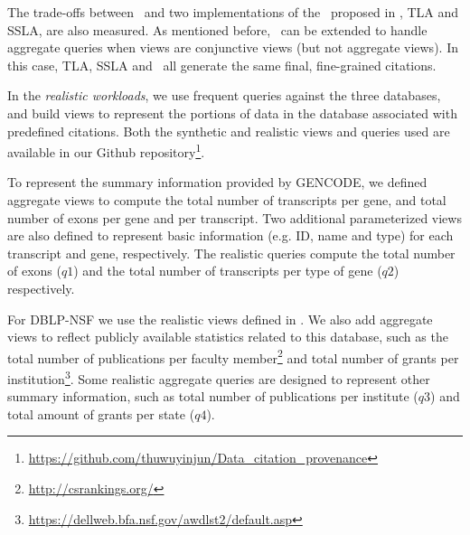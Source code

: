 The trade-offs between \provalg\ and two implementations of the \rba\ proposed in \cite{wu2018data}, TLA and SSLA, are also  measured. 
As mentioned before, \rba\ can be extended to handle aggregate queries when views are conjunctive views (but not aggregate views). In this case, TLA, SSLA and \provalg\ all generate the same final, fine-grained citations.


In the {\em realistic workloads}, we use frequent queries against the three databases, and build views to represent the portions of data in the database associated with predefined citations. Both the synthetic and realistic views and queries used are available in our Github repository\footnote{\url{https://github.com/thuwuyinjun/Data_citation_provenance}}. 

To represent the summary information provided by GENCODE, we defined aggregate views to compute the total number of transcripts per gene, and total number of exons per gene and per transcript. Two additional parameterized views are also defined to represent basic information (e.g. ID, name and type) for each transcript and gene, respectively. The realistic queries  compute the total number of exons ($q1$) and the total number of transcripts per type of gene ($q2$) respectively.

For DBLP-NSF we use the realistic views defined in \cite{wu2018data}. We also add aggregate views to reflect publicly available statistics related to this database, such as the total number of publications per faculty member\footnote{\url{http://csrankings.org/}} and total number of grants per institution\footnote{\url{https://dellweb.bfa.nsf.gov/awdlst2/default.asp}}. Some realistic aggregate queries are designed to represent other summary information, such as total number of publications per institute ($q3$) and total amount of grants per state ($q4$).

